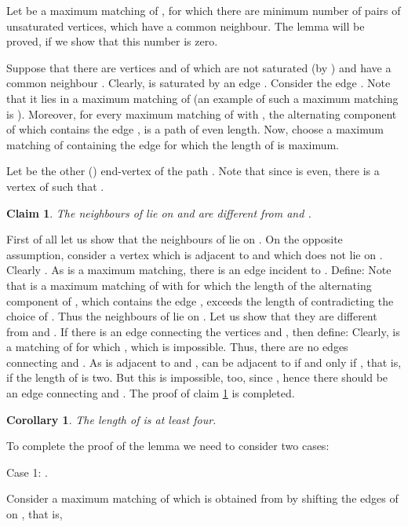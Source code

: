 \documentclass[fleqn,12pt,twoside]{article}
\newtheorem{claim}{Claim}
\newtheorem{corollary}{Corollary}
\newenvironment{proof}[1][Proof.]{\begin{trivlist}
\item[\hskip \labelsep {\bfseries #1}]}{\end{trivlist}}
\begin{document}
\begin{proof}
Let  be a maximum matching of , for which there are minimum
number of pairs of unsaturated vertices, which have a common
neighbour. The lemma will be proved, if we show that this number is
zero.

Suppose that there are vertices  and  of  which are not
saturated (by ) and have a common neighbour . Clearly,  is
saturated by an edge . Consider the edge . Note
that it lies in a maximum matching of  (an example of such a
maximum matching is ). Moreover,
for every maximum matching 
of  with , the alternating component  of  which contains the edge , is a path of
even length. Now, choose a maximum matching  of 
containing the edge  for which the length of  is maximum.

Let  be the other () end-vertex of the path . Note
that since  is even, there is a vertex  of  such that .

\begin{claim}
\label{Neighbours V}The neighbours of  lie on  and are
different from  and .
\end{claim}

\begin{proof}
First of all let us show that the neighbours of  lie on .
On the opposite assumption, consider a vertex  which is
adjacent to  and which does not lie on . Clearly
. As  is a
maximum matching, there is an edge  incident to
. Define:
Note that  is a maximum matching of  with
 for which the length of the alternating component of , which contains the edge ,
exceeds the length of  contradicting the choice of . Thus the
neighbours of  lie on . Let us show that they are different from  and . If there is an edge  connecting the vertices  and , then define:
Clearly,  is a matching of  for which ,
which is impossible. Thus, there are no edges connecting  and . As  is adjacent to  and ,  can be adjacent to  if and
only if , that is, if the length of  is two. But this is
impossible, too, since , hence there should be an
edge connecting  and . The proof of claim \ref{Neighbours V}
is completed.
\end{proof}

\begin{corollary}
The length of  is at least four.
\end{corollary}

To complete the proof of the lemma we need to consider two cases:

Case 1: .

Consider a maximum matching  of  which is obtained from
 by
shifting the edges of  on , that is,


\end{proof}
\end{document}
